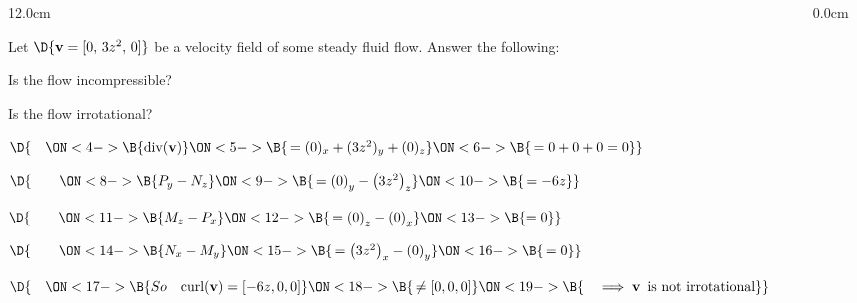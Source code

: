 \begin{frame}
\frametitle{}
\scriptsize
\begin{columns}\begin{column}{12.0cm}

\EX Let $\D{{\bf v} = [0,\, 3z^2,\, 0]}$ be a velocity field of some steady fluid flow.  Answer the following:

\vspace{0.1cm} 

\OBUL Is the flow incompressible?  \quad
{}

\vspace{0.1cm}

\OBUL Is the flow irrotational?  \quad
{}

\vspace{0.1cm}


%

\vspace{0.6cm}

$\D{\quad
\ON<4->{\B{\text{div}({\bf v})}}
\ON<5->{\B{\, = (0)_x + (3z^2)_y + (0)_z}}
\ON<6->{\B{\, = 0 + 0 + 0 = 0}}}$ \quad 
{}

\vspace{0.8cm}

$\D{\qquad
\ON<8->{\B{P_y-N_z }}
\ON<9->{\B{\, = \left(0\right)_y - \left(3z^2\right)_z }}
\ON<10->{\B{\, = -6z}}}$

\vspace{0.3cm}

$\D{\qquad
\ON<11->{\B{M_z-P_x }}
\ON<12->{\B{\,= \left(0\right)_z - \left(0\right)_x }}
\ON<13->{\B{= 0}}}$

\vspace{0.3cm}

$\D{\qquad
\ON<14->{\B{N_x-M_y }}
\ON<15->{\B{\,= \left(3z^2\right)_x - \left(0\right)_y }}
\ON<16->{\B{\,= 0}}}$

\vspace{0.3cm}

$\D{\quad 
\ON<17->{\B{So \quad \text{curl}({\bf v}) = [-6z,0,0] }}
\ON<18->{\B{\, \ne [0,0,0]}}
\ON<19->{\B{\quad \implies {\bf v} \text{\, is not irrotational}}}}$

\vspace{3.2cm}

\end{column}\begin{column}{0.0cm}\end{column}\end{columns}
\end{frame}

